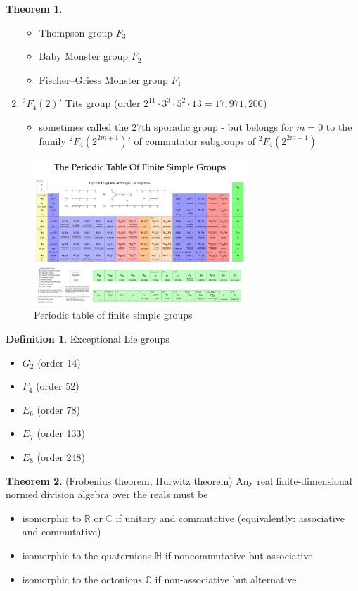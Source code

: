 \documentclass[10pt,a4paper]{article}
\theoremstyle{definition}
\newtheorem{definition}{Definition}[section]
\newtheorem{theorem}{Theorem}[section]
\begin{document}
\begin{theorem}
\begin{enumerate}
\begin{itemize}
        \item Thompson group $F_3$
        \item Baby Monster group $F_2$
        \item Fischer–Griess Monster group $F_1$
    \end{itemize}
    \item $^2F_4(2)'$ Tits group (order $2^11\cdot3^3\cdot5^2\cdot13=17,971,200$)
    \begin{itemize}
        \item sometimes called the 27th sporadic group - but belongs for $m=0$ to the family $^2F_4(2^{2m+1})'$ of commutator subgroups of $^2F_4(2^{2m+1})$
    \end{itemize}
\end{enumerate}
\end{theorem}

\begin{figure}[htp]
    \centering
    \includegraphics[width=8cm]{PTFSG.jpg}
    \caption{Periodic table of finite simple groups }
    \label{fig:galaxy}
\end{figure}

\begin{definition}{}
Exceptional Lie groups 
\begin{itemize}
    \item $G_2$ (order 14)
    \item $F_4$ (order 52)
    \item $E_6$ (order 78)
    \item $E_7$ (order 133)
    \item $E_8$ (order 248)
\end{itemize}
\end{definition}

\begin{theorem}
(Frobenius theorem, Hurwitz theorem) Any real finite-dimensional normed division algebra over the reals must be
\begin{itemize}
    \item isomorphic to $\mathbb{R}$ or $\mathbb{C}$ if unitary and commutative (equivalently: associative and commutative)
    \item isomorphic to the quaternions $\mathbb{H}$ if noncommutative but associative
    \item isomorphic to the octonions $\mathbb{O}$ if non-associative but alternative.
\end{itemize}
\end{theorem}
\end{document}

